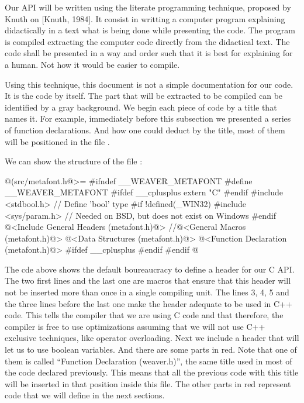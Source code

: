 
Our API will be written using the literate programming technique,
proposed by Knuth on [Knuth, 1984]. It consist in writting a computer
program explaining didactically in a text what is being done while
presenting the code. The program is compiled extracting the computer
code directly from the didactical text. The code shall be presented in
a way and order such that it is best for explaining for a human. Not
how it would be easier to compile.

Using this technique, this document is not a simple documentation for
our code. It is the code by itself. The part that will be extracted to
be compiled can be identified by a gray background. We begin each
piece of code by a title that names it. For example, immediately
before this subsection we presented a series of function
declarations. And how one could deduct by the title, most of them will
be positioned in the file .

We can show the structure of the file :

\iniciocodigo
@(src/metafont.h@>=
#ifndef __WEAVER_METAFONT
#define __WEAVER_METAFONT
#ifdef __cplusplus
extern "C" {
#endif
#include <stdbool.h> // Define  'bool' type
#if !defined(_WIN32)
#include <sys/param.h> // Needed on BSD, but does not exist on Windows
#endif
@<Include General Headers (metafont.h)@>
//@<General Macros (metafont.h)@>
@<Data Structures (metafont.h)@>
@<Function Declaration (metafont.h)@>
#ifdef __cplusplus
}
#endif
#endif
@
\fimcodigo

The cde above shows the default boureaucracy to define a header for
our C API. The two first lines and the last one are macros that ensure
that this header will not be inserted more than once in a single
compiling unit. The lines 3, 4, 5 and the three lines before the last
one make the header adequate to be used in C++ code. This tells the
compiler that we are using C code and that therefore, the compiler is
free to use optimizations assuming that we will not use C++ exclusive
techniques, like operator overloading. Next we include a header that
will let us to use boolean variables. And there are some parts in
red. Note that one of them is called ``Function Declaration
(weaver.h)'', the same title used in most of the code declared
previously. This means that all the previous code with this title will
be inserted in that position inside this file. The other parts in red
represent code that we will define in the next sections.

